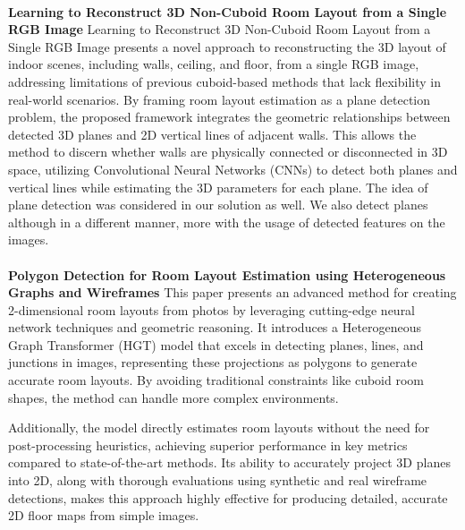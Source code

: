 \paragraph{}

\textbf{Learning to Reconstruct 3D Non-Cuboid Room Layout from a Single RGB Image} Learning to Reconstruct 3D Non-Cuboid Room Layout from a Single RGB Image\cite{9707088} presents a novel approach to reconstructing the 3D layout of indoor scenes, including walls, ceiling, and floor, from a single RGB image, addressing limitations of previous cuboid-based methods that lack flexibility in real-world scenarios. By framing room layout estimation as a plane detection problem, the proposed framework integrates the geometric relationships between detected 3D planes and 2D vertical lines of adjacent walls. This allows the method to discern whether walls are physically connected or disconnected in 3D space, utilizing Convolutional Neural Networks (CNNs) to detect both planes and vertical lines while estimating the 3D parameters for each plane. The idea of plane detection was considered in our solution as well. We also detect planes although in a different manner, more with the usage of detected features on the images. 

\paragraph{}

\textbf{Polygon Detection for Room Layout Estimation using Heterogeneous Graphs and Wireframes}
This paper \cite{10350607} presents an advanced method for creating 2-dimensional room layouts from photos by leveraging cutting-edge neural network techniques and geometric reasoning. 
It introduces a Heterogeneous Graph Transformer (HGT) model that excels in detecting planes, lines, and junctions in images, representing these projections as polygons to generate accurate room layouts. 
By avoiding traditional constraints like cuboid room shapes, the method can handle more complex environments. 

Additionally, the model directly estimates room layouts without the need for post-processing heuristics, achieving superior performance in key metrics compared to state-of-the-art methods. 
Its ability to accurately project 3D planes into 2D, along with thorough evaluations using synthetic and real wireframe detections, makes this approach highly effective for producing detailed, accurate 2D floor maps from simple images.


